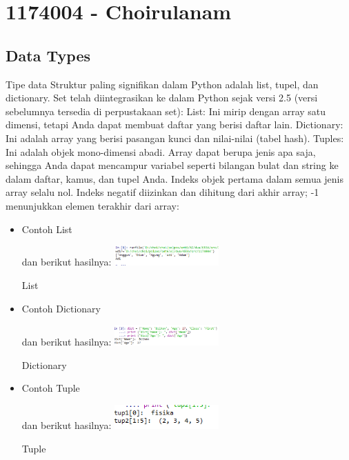 \section{1174004 - Choirulanam}
\subsection{Data Types}
\begin{enumerate}
	\hfill\break
	Tipe data Struktur paling signifikan dalam Python adalah list, tupel, dan dictionary. Set telah diintegrasikan ke dalam Python sejak versi 2.5 (versi sebelumnya tersedia di perpustakaan set): List: Ini mirip dengan array satu dimensi, tetapi Anda dapat membuat daftar yang berisi daftar lain. Dictionary: Ini adalah array yang berisi pasangan kunci dan nilai-nilai (tabel hash). Tuples: Ini adalah objek mono-dimensi abadi. Array dapat berupa jenis apa saja, sehingga Anda dapat mencampur variabel seperti bilangan bulat dan string ke dalam daftar, kamus, dan tupel Anda. Indeks objek pertama dalam semua jenis array selalu nol. Indeks negatif diizinkan dan dihitung dari akhir array; -1 menunjukkan elemen terakhir dari array:
	\begin{itemize}
		\item Contoh List
		\hfill\break
	           
		\hfill\break
		dan berikut hasilnya:
		\includegraphics[width=4cm]{figures/kelompok1/1/anam/list.png}
		\centering
		\caption{List}
		\item Contoh Dictionary
		\hfill\break
	           
		\hfill\break
		dan berikut hasilnya:
		\includegraphics[width=4cm]{figures/kelompok1/1/anam/dict.png}
		\centering
		\caption{Dictionary}
		\item Contoh Tuple
		\hfill\break
	           
		\hfill\break
		dan berikut hasilnya:
		\includegraphics[width=4cm]{figures/kelompok1/1/anam/tupl.png}
		\centering
		\caption{Tuple}

\end{itemize}
\end{enumerate}
